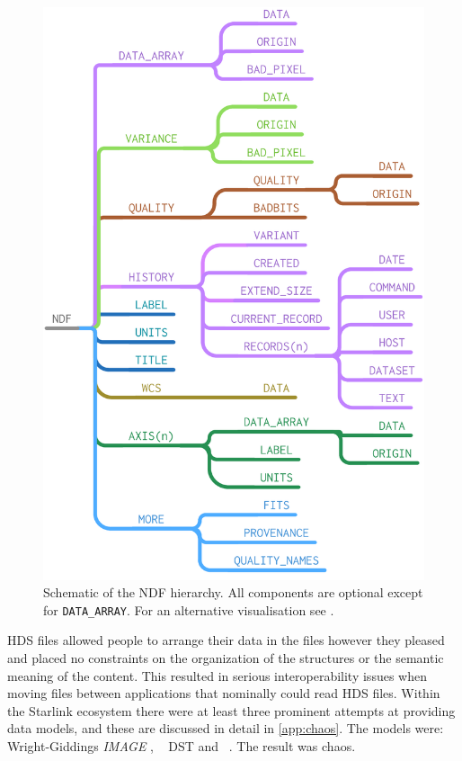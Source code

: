 \documentclass[final,authoryear,5p,times,twocolumn]{elsarticle}
\begin{document}
\begin{figure}[t]
\includegraphics[width=\columnwidth]{model-ndf}
\caption{Schematic of the NDF hierarchy. All components are optional
  except for \texttt{DATA\_ARRAY}. For an alternative visualisation
  see \citet{2002ASPC..281...20G}.}
\label{fig:ndf-structure}
\end{figure}

HDS files allowed people to arrange their data in the files however
they pleased and placed no constraints on the organization of the
structures or the semantic meaning of the content. This resulted in
serious interoperability issues when moving files between applications
that nominally could read HDS files. Within the Starlink ecosystem
there were at least three prominent attempts at providing data
models, and these are discussed in detail in \ref{app:chaos}. The
models were: Wright-Giddings \emph{IMAGE} \citep{WrightGiddings1983}, \figaro\
\citep[][]{1993ASPC...52..219S} DST
and \asterix\
\citep[][]{1987JBIS...40..185P}.
The result was chaos.
\end{document}
